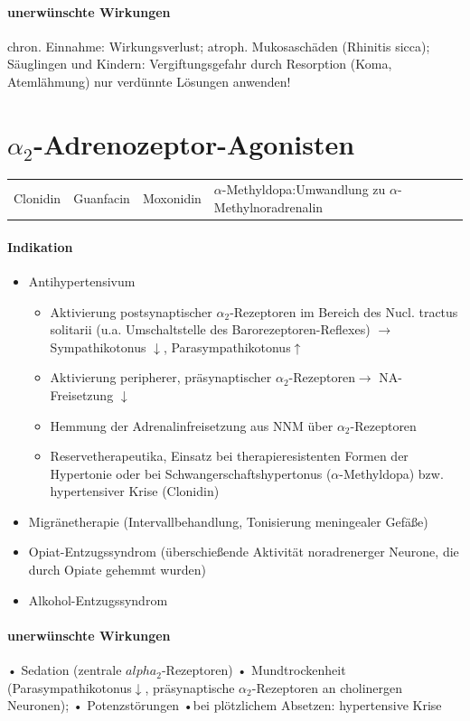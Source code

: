 \documentclass[10pt,a4paper]{report}
\begin{document}
\paragraph{unerwünschte Wirkungen}chron. Einnahme: Wirkungsverlust; atroph. Mukosaschäden  (Rhinitis sicca); Säuglingen und Kindern: Vergiftungsgefahr durch Resorption (Koma, Atemlähmung) nur verdünnte Lösungen anwenden!
\section{$\alpha_2$-Adrenozeptor-Agonisten}
\begin{tabularx}{\textwidth}{XXXX}
Clonidin&Guanfacin&Moxonidin&$\alpha$-Methyldopa:Umwandlung zu $\alpha$-Methylnoradrenalin
\end{tabularx}
\paragraph{Indikation}
\begin{itemize}
	\item Antihypertensivum
	\begin{itemize}
		\item Aktivierung postsynaptischer $\alpha_2$-Rezeptoren im Bereich des	Nucl. tractus solitarii (u.a. Umschaltstelle des Barorezeptoren-Reflexes) $\rightarrow$ Sympathikotonus $\downarrow$, Parasympathikotonus$\uparrow$
		\item Aktivierung peripherer, präsynaptischer $\alpha_2$-Rezeptoren$\rightarrow$ NA-Freisetzung $\downarrow$ 
		\item Hemmung der Adrenalinfreisetzung aus NNM über $\alpha_2$-Rezeptoren 
		\item Reservetherapeutika, Einsatz bei therapieresistenten Formen 	der Hypertonie oder bei Schwangerschaftshypertonus	($\alpha$-Methyldopa) bzw. hypertensiver Krise (Clonidin)
	\end{itemize}	
	\item Migränetherapie (Intervallbehandlung, Tonisierung meningealer Gefäße)
	\item Opiat-Entzugssyndrom (überschießende Aktivität noradrenerger Neurone, die durch Opiate gehemmt wurden)
	\item Alkohol-Entzugssyndrom 
\end{itemize}
\paragraph{unerwünschte Wirkungen}
• Sedation (zentrale $alpha_2$-Rezeptoren) • Mundtrockenheit (Parasympathikotonus$\downarrow$, präsynaptische $\alpha_2$-Rezeptoren an cholinergen Neuronen); • Potenzstörungen •bei plötzlichem Absetzen: hypertensive Krise
\end{document}
